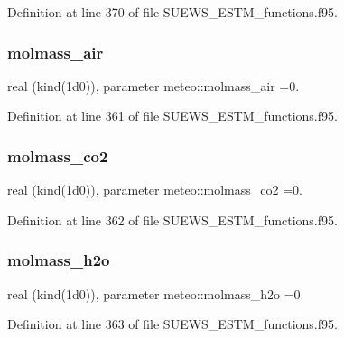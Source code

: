 Definition at line 370 of file S\+U\+E\+W\+S\+\_\+\+E\+S\+T\+M\+\_\+functions.\+f95.

\mbox{\label{namespacemeteo_a54b7cd84df1d97cb79965d43460ad694}} 
\subsubsection{\texorpdfstring{molmass\+\_\+air}{molmass\_air}}
{\footnotesize\ttfamily real (kind(1d0)), parameter meteo\+::molmass\+\_\+air =0.}



Definition at line 361 of file S\+U\+E\+W\+S\+\_\+\+E\+S\+T\+M\+\_\+functions.\+f95.

\mbox{\label{namespacemeteo_acb7ea078c76c3b3d8eed2c1f1df3f6ba}} 
\subsubsection{\texorpdfstring{molmass\+\_\+co2}{molmass\_co2}}
{\footnotesize\ttfamily real (kind(1d0)), parameter meteo\+::molmass\+\_\+co2 =0.}



Definition at line 362 of file S\+U\+E\+W\+S\+\_\+\+E\+S\+T\+M\+\_\+functions.\+f95.

\mbox{\label{namespacemeteo_aae3f90f9d5c4581ccb0a05acee54f2ac}} 
\subsubsection{\texorpdfstring{molmass\+\_\+h2o}{molmass\_h2o}}
{\footnotesize\ttfamily real (kind(1d0)), parameter meteo\+::molmass\+\_\+h2o =0.}



Definition at line 363 of file S\+U\+E\+W\+S\+\_\+\+E\+S\+T\+M\+\_\+functions.\+f95.

\mbox{\label{namespacemeteo_a5e25bc167da1551976c0f934a28b9c41}} 
